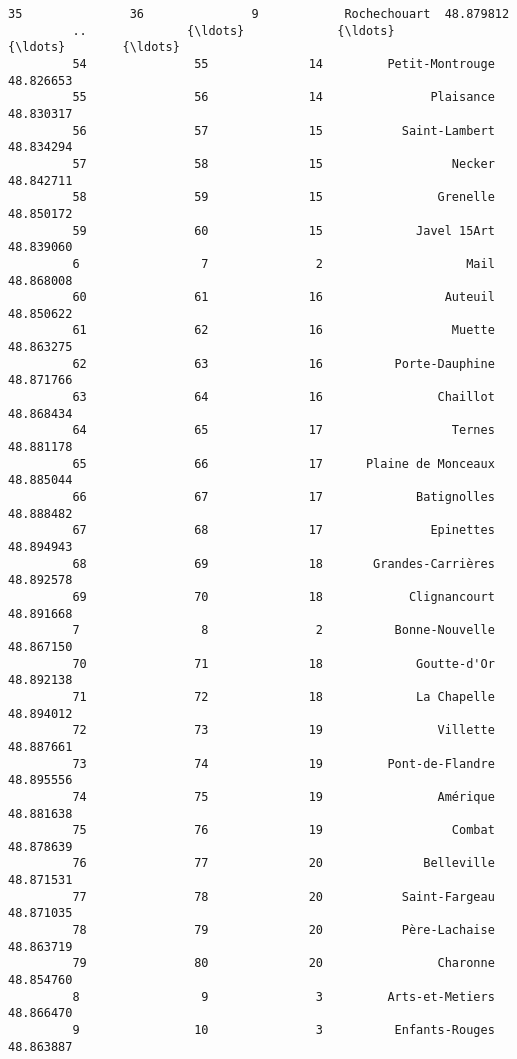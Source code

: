 \documentclass[11pt]{article}
\begin{document}
\begin{Verbatim}[commandchars=\\\{\}]
         35               36               9            Rochechouart  48.879812   
         ..              {\ldots}             {\ldots}                     {\ldots}        {\ldots}   
         54               55              14         Petit-Montrouge  48.826653   
         55               56              14               Plaisance  48.830317   
         56               57              15           Saint-Lambert  48.834294   
         57               58              15                  Necker  48.842711   
         58               59              15                Grenelle  48.850172   
         59               60              15             Javel 15Art  48.839060   
         6                 7               2                    Mail  48.868008   
         60               61              16                 Auteuil  48.850622   
         61               62              16                  Muette  48.863275   
         62               63              16          Porte-Dauphine  48.871766   
         63               64              16                Chaillot  48.868434   
         64               65              17                  Ternes  48.881178   
         65               66              17      Plaine de Monceaux  48.885044   
         66               67              17             Batignolles  48.888482   
         67               68              17               Epinettes  48.894943   
         68               69              18       Grandes-Carrières  48.892578   
         69               70              18            Clignancourt  48.891668   
         7                 8               2          Bonne-Nouvelle  48.867150   
         70               71              18             Goutte-d'Or  48.892138   
         71               72              18             La Chapelle  48.894012   
         72               73              19                Villette  48.887661   
         73               74              19         Pont-de-Flandre  48.895556   
         74               75              19                Amérique  48.881638   
         75               76              19                  Combat  48.878639   
         76               77              20              Belleville  48.871531   
         77               78              20           Saint-Fargeau  48.871035   
         78               79              20           Père-Lachaise  48.863719   
         79               80              20                Charonne  48.854760   
         8                 9               3         Arts-et-Metiers  48.866470   
         9                10               3          Enfants-Rouges  48.863887   
         

\end{Verbatim}
\end{document}
